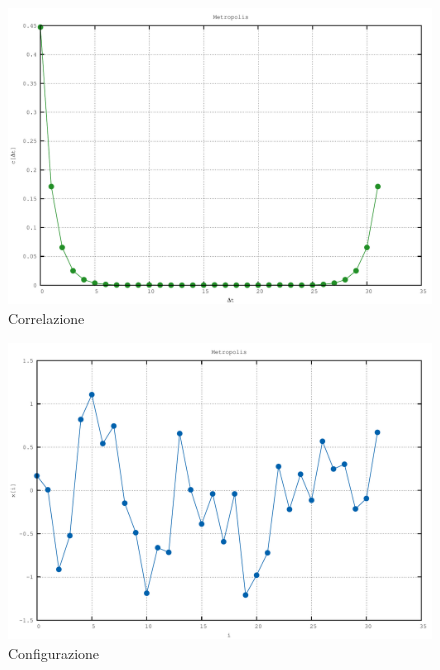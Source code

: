 \documentclass[a4paper,11pt]{report}
\begin{document}
\begin{figure}[htb]
\centering
\includegraphics[width=\textwidth]{correlation}
\caption{Correlazione}
\label{fig:correlation}
\end{figure}

\begin{figure}[htb]
\centering
\includegraphics[width=\textwidth]{configuration}
\caption{Configurazione}
\label{fig:configuration}
\end{figure}
\end{document}
